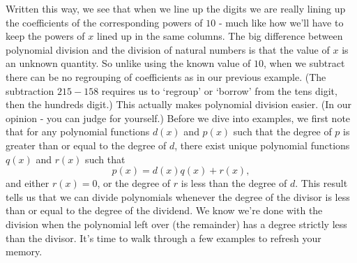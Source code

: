 Written this way, we see that when we line up the digits we are really lining up the coefficients of the corresponding powers of $10$ - much like how we'll have to keep the powers of $x$ lined up in the same columns.  The big difference between polynomial division and the division of natural numbers is that the value of $x$ is an unknown quantity.  So unlike using the known value of $10$, when we subtract there can be no regrouping of coefficients as in our previous example. (The subtraction $215 - 158$ requires us to `regroup' or `borrow' from the tens digit, then the hundreds digit.) This actually makes polynomial division easier. (In our opinion - you can judge for yourself.)  Before we dive into examples, we first note that for any polynomial functions $d(x)$ and $p(x)$ such that the degree of $p$ is greater than or equal to the degree of $d$, there exist unique polynomial functions $q(x)$ and $r(x)$ such that
\[
p(x) = d(x)q(x)+r(x),
\]
and either $r(x)=0$, or the degree of $r$ is less than the degree of $d$. This result tells us that we can divide polynomials whenever the degree of the divisor is less than or equal to the degree of the dividend.  We know we're done with the division when the polynomial left over (the remainder) has a degree strictly less than the divisor.  It's time to walk through a few examples to refresh your memory.

